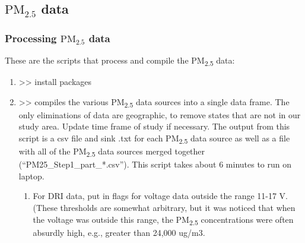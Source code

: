 \subsection{$\textrm{PM}_{2.5}$ data}%

\subsubsection{Processing $\textrm{PM}_{2.5}$ data}

These are the scripts that process and compile the PM\textsubscript{2.5} data:
\begin{enumerate}[nolistsep]
\item {} >> install packages

\item {} >> compiles the various PM\textsubscript{2.5} data sources into a single data frame. The only eliminations of data are geographic, to remove states that are not in our study area. Update time frame of study if necessary. The output from this script is a csv file and sink .txt for each  PM\textsubscript{2.5} data source as well as a file with all of the PM\textsubscript{2.5} data sources merged together (``PM25\_Step1\_part\_*.csv''). This script takes about 6 minutes to run on laptop.
	\begin{enumerate}
	\item For DRI data, put in flags for voltage data outside the range 11-17 V. (These thresholds are somewhat arbitrary, but it was noticed that when the voltage was outside this range, the PM\textsubscript{2.5} concentrations were often absurdly high, e.g., greater than 24,000 ug/m3.
	\end{enumerate}


\end{enumerate}
